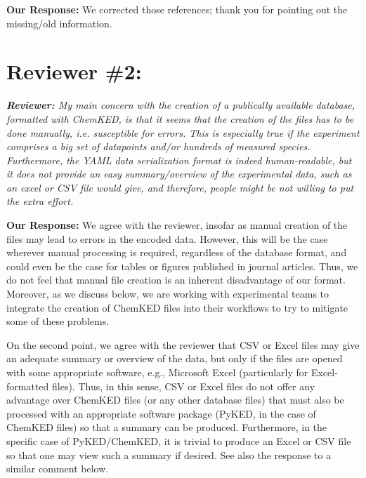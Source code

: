 \documentclass[a4paper,10pt]{elsarticle}
\newenvironment{reviewer}{\vspace{0.5\baselineskip}\begingroup\itshape\textbf{Reviewer:}}{\endgroup}
\newenvironment{response}{\textbf{Our Response:}}{\vspace{0.5\baselineskip}}
\begin{document}
\begin{response}
    We corrected those references; thank you for pointing out the missing\slash old information.
\end{response}

\section*{Reviewer \#2:}

\begin{reviewer}
    My main concern with the creation of a publically available database, formatted with ChemKED, is
    that it seems that the creation of the files has to be done manually, i.e. susceptible for
    errors. This is especially true if the experiment comprises a big set of datapoints and/or
    hundreds of measured species. Furthermore, the YAML data serialization format is indeed
    human-readable, but it does not provide an easy summary/overview of the experimental data, such
    as an excel or CSV file would give, and therefore, people might be not willing to put the extra
    effort.
\end{reviewer}

\begin{response}
    We agree with the reviewer, insofar as manual creation of the files may lead to errors in the
    encoded data. However, this will be the case wherever manual processing is required, regardless
    of the database format, and could even be the case for tables or figures published in journal
    articles. Thus, we do not feel that manual file creation is an inherent disadvantage of our
    format. Moreover, as we discuss below, we are working with experimental teams to integrate the
    creation of ChemKED files into their workflows to try to mitigate some of these problems.

    On the second point, we agree with the reviewer that CSV or Excel files may give an adequate
    summary or overview of the data, but only if the files are opened with some appropriate
    software, e.g., Microsoft Excel (particularly for Excel-formatted files). Thus, in this sense,
    CSV or Excel files do not offer any advantage over ChemKED files (or any other database files)
    that must also be processed with an appropriate software package (PyKED, in the case of ChemKED
    files) so that a summary can be produced. Furthermore, in the specific case of PyKED/ChemKED,
    it is trivial to produce an Excel or CSV file so that one may view such a summary if desired.
    See also the response to a similar comment below.
\end{response}
\end{document}
